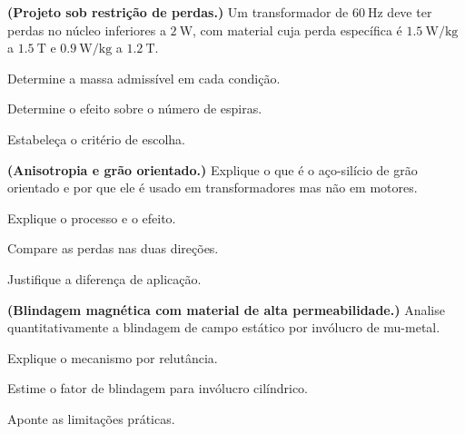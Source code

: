 \begin{questao}[4]{}

\textbf{(Projeto sob restrição de perdas.)} Um transformador de
$\SI{60}{\hertz}$ deve ter perdas no núcleo inferiores a $\SI{2}{\watt}$, com
material cuja perda específica é
$\SI{1.5}{\watt\per\kilogram}$ a $\SI{1.5}{\tesla}$ e
$\SI{0.9}{\watt\per\kilogram}$ a $\SI{1.2}{\tesla}$.
\begin{itensq}
\item Determine a massa admissível em cada condição.
\item Determine o efeito sobre o número de espiras.
\item Estabeleça o critério de escolha.
\end{itensq}


\end{questao}
\begin{questao}[4]{}

\textbf{(Anisotropia e grão orientado.)} Explique o que é o aço-silício de grão
orientado e por que ele é usado em transformadores mas não em motores.
\begin{itensq}
\item Explique o processo e o efeito.
\item Compare as perdas nas duas direções.
\item Justifique a diferença de aplicação.
\end{itensq}


\end{questao}
\begin{questao}[4]{}

\textbf{(Blindagem magnética com material de alta permeabilidade.)} Analise
quantitativamente a blindagem de campo estático por invólucro de mu-metal.
\begin{itensq}
\item Explique o mecanismo por relutância.
\item Estime o fator de blindagem para invólucro cilíndrico.
\item Aponte as limitações práticas.
\end{itensq}


\end{questao}
